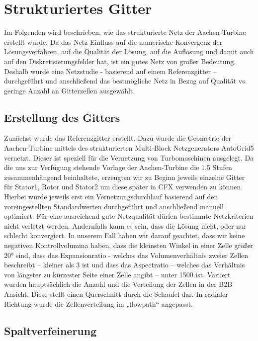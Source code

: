 \section{Strukturiertes Gitter}
Im Folgenden wird beschrieben, wie das strukturierte Netz der Aachen-Turbine erstellt wurde. Da das Netz Einfluss auf die numerische Konvergenz der Lösungsverfahren, auf die Qualität der Lösung, auf die Auflösung und damit auch auf den Diskretisierungsfehler hat, ist ein gutes Netz von großer Bedeutung. Deshalb wurde eine Netzstudie - basierend auf einem Referenzgitter – durchgeführt und anschließend das bestmögliche Netz in Bezug auf Qualität vs. geringe Anzahl an Gitterzellen ausgewählt. 

\subsection{Erstellung des Gitters}

Zunächst wurde das Referenzgitter erstellt. Dazu wurde die Geometrie der Aachen-Turbine mittels des strukturierten Multi-Block Netzgenerators AutoGrid5 vernetzt. Dieser ist speziell für die Vernetzung von Turbomaschinen ausgelegt. 
Da die uns zur Verfügung stehende Vorlage der Aachen-Turbine die 1,5 Stufen zusammenhängend beinhaltete, erzeugten wir zu Beginn jeweils einzelne Gitter für Stator1, Rotor und Stator2 um diese später in CFX verwenden zu können. Hierbei wurde jeweils erst ein Vernetzungsdurchlauf basierend auf den voreingestellten Standardwerten durchgeführt und anschließend manuell optimiert. Für eine ausreichend gute Netzqualität dürfen bestimmte Netzkriterien nicht verletzt werden. Andernfalls kann es sein, dass die Lösung nicht, oder nur schlecht konvergiert. In unserem Fall haben wir darauf geachtet, dass wir keine negativen Kontrollvolumina haben, dass die kleinsten Winkel in einer Zelle größer 20° sind, dass das Expansionratio - welches das Volumenverhältnis zweier Zellen beschreibt – kleiner als 3 ist und dass das Aspectratio – welches das Verhältnis von längster zu kürzester Seite einer Zelle angibt – unter 1500 ist. Variiert wurden hauptsächlich die Anzahl und die Verteilung der Zellen in der B2B Ansicht. Diese stellt einen Querschnitt durch die Schaufel dar. In radialer Richtung wurde die Zellenverteilung im „flowpath“ angepasst. 

\subsection{Spaltverfeinerung}

